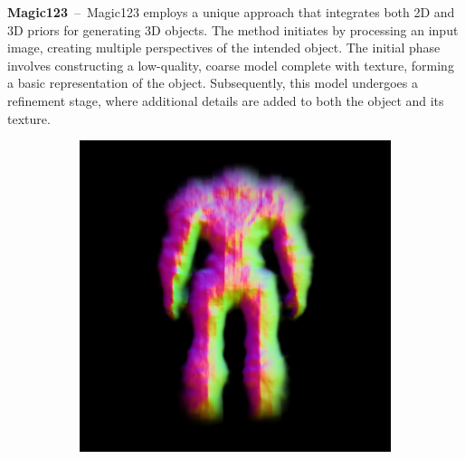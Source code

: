 \textbf{Magic123}~--~Magic123 employs a unique approach that integrates both 2D and 3D priors for generating 3D objects. The method initiates by processing an input image, creating multiple perspectives of the intended object. The initial phase involves constructing a low-quality, coarse model complete with texture, forming a basic representation of the object. Subsequently, this model undergoes a refinement stage, where additional details are added to both the object and its texture.

\begin{figure}[H]
    \centering
    \begin{subfigure}[b]{0.25\textwidth}
        \centering
        \fontsize{9pt}{7pt}\selectfont{}\vspace{.1cm}
        \includegraphics[width=\textwidth]{etc/a robot made out of plants/magic123/magic123_coarse_robot_front_0_part2.png}

\end{subfigure}
\end{figure}
